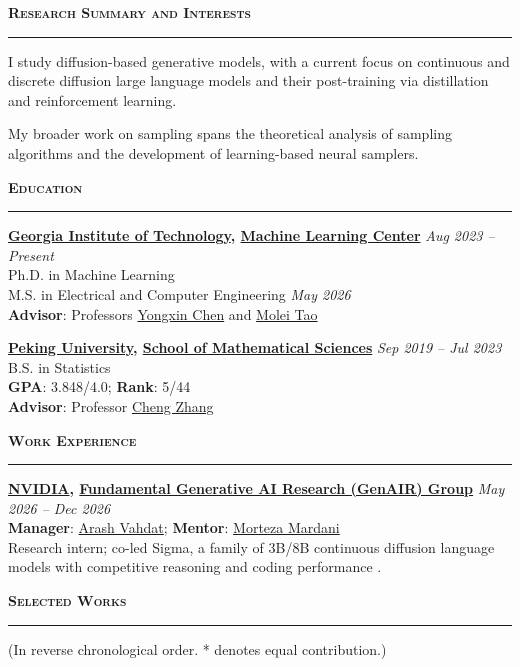 \documentclass{resume} %
\renewenvironment{rSection}[1]{
\sectionskip
\textcolor{LinkNavy}{\textbf{\textsc{#1}}}
\sectionlineskip
\hrule
\begin{list}{}{
\setlength{\leftmargin}{1.5em}
}
\item[]
}{
\end{list}
}
\begin{document}
\begin{rSection}{Research Summary and Interests}
I study diffusion-based generative models, with a current focus on continuous and discrete diffusion large language models and their post-training via distillation and reinforcement learning.

My broader work on sampling spans the theoretical analysis of sampling algorithms and the development of learning-based neural samplers.
\end{rSection}

\begin{rSection}{Education}
{\bf \href{https://www.gatech.edu/}{Georgia Institute of Technology}, \href{https://ml.gatech.edu/}{Machine Learning Center}} \hfill {\em Aug 2023 -- Present} 
\\ Ph.D. in Machine Learning\hfill
\\ M.S. in Electrical and Computer Engineering \hfill {\em May 2026}
\\ \textbf{Advisor}: Professors \href{https://yongxin.ae.gatech.edu/}{Yongxin Chen} and \href{https://mtao8.math.gatech.edu/index.html}{Molei Tao}

{\bf \href{https://www.pku.edu.cn/}{Peking University}, \href{https://www.math.pku.edu.cn/}{School of Mathematical Sciences}} \hfill {\em Sep 2019 -- Jul 2023} 
\\ B.S. in Statistics
\\ \textbf{GPA}: 3.848/4.0; \textbf{Rank}: 5/44 \hfill
\\ \textbf{Advisor}: Professor \href{https://zcrabbit.github.io/}{Cheng Zhang} 
\end{rSection}

\begin{rSection}{Work Experience}
{\bf \href{https://www.nvidia.com/}{NVIDIA}, \href{https://research.nvidia.com/labs/genair/}{Fundamental Generative AI Research (GenAIR) Group}} \hfill {\em May 2026 -- Dec 2026}
\\ \textbf{Manager}: \href{http://latentspace.cc/}{Arash Vahdat}; \textbf{Mentor}: \href{https://mortezamardani.github.io/morteza/}{Morteza Mardani}
\\
Research intern; co-led Sigma, a family of 3B/8B continuous diffusion language models with competitive reasoning and coding performance \cite{yang2026large}.
\end{rSection}


\begin{rSection}{Selected Works}
    (In reverse chronological order. * denotes equal contribution.)
    \itemsep -2pt
    \nocite{
        yang2026large,
        zhu2026enhancing,
        yang2026continuous,
        guo2026discrete,
        zhu2025mdns,
    }
    \leavevmode\printbibliography[heading=none, category=selected]
\end{rSection}
\end{document}
